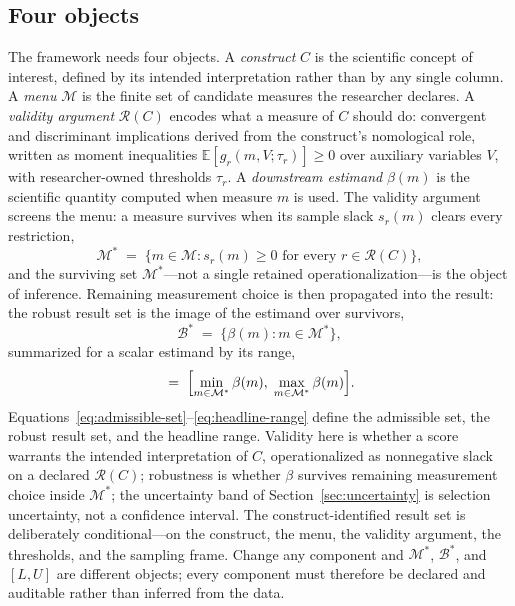 \documentclass[10pt,letterpaper]{article}
\newcommand{\M}{\ensuremath{\mathcal{M}}}
\newcommand{\E}{\mathbb{E}}
\newcommand{\Rset}{\mathcal{R}}
\newcommand{\Bset}{\mathcal{B}}
\begin{document}
\subsection{Four objects}
The framework needs four objects.
A \emph{construct} $C$ is the scientific concept of interest, defined by its intended interpretation rather than by any single column.
A \emph{menu} $\M$ is the finite set of candidate measures the researcher declares.
A \emph{validity argument} $\Rset(C)$ encodes what a measure of $C$ should do: convergent and discriminant implications derived from the construct's nomological role, written as moment inequalities $\E[g_r(m,V;\tau_r)]\ge 0$ over auxiliary variables $V$, with researcher-owned thresholds $\tau_r$.
A \emph{downstream estimand} $\beta(m)$ is the scientific quantity computed when measure $m$ is used.
The validity argument screens the menu: a measure survives when its sample slack $s_r(m)$ clears every restriction,
\begin{equation}
\M^* \;=\; \bigl\{ m \in \M : s_r(m) \ge 0 \text{ for every } r \in \Rset(C) \bigr\},
\label{eq:admissible-set}
\end{equation}
and the surviving set $\M^*$---not a single retained operationalization---is the object of inference.
Remaining measurement choice is then propagated into the result: the robust result set is the image of the estimand over survivors,
\begin{equation}
\Bset^* \;=\; \bigl\{ \beta(m) : m \in \M^* \bigr\},
\label{eq:robust-image}
\end{equation}
summarized for a scalar estimand by its range,
\begin{equation}
[L,U] \;=\; \Bigl[ \min_{m\in\M^*} \beta(m),\; \max_{m\in\M^*} \beta(m) \Bigr].
\label{eq:headline-range}
\end{equation}
Equations~\eqref{eq:admissible-set}--\eqref{eq:headline-range} define the admissible set, the robust result set, and the headline range.
Validity here is whether a score warrants the intended interpretation of $C$, operationalized as nonnegative slack on a declared $\Rset(C)$; robustness is whether $\beta$ survives remaining measurement choice inside $\M^*$; the uncertainty band of Section~\ref{sec:uncertainty} is selection uncertainty, not a confidence interval.
The construct-identified result set is deliberately conditional---on the construct, the menu, the validity argument, the thresholds, and the sampling frame.
Change any component and $\M^*$, $\Bset^*$, and $[L,U]$ are different objects; every component must therefore be declared and auditable rather than inferred from the data.
\end{document}

